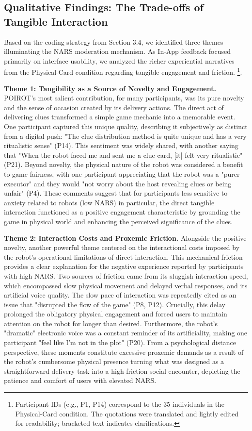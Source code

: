 \documentclass[sigconf,screen]{acmart-tagged}
\begin{document}
\vspace{-2pt}
\subsection{Qualitative Findings: The Trade-offs of Tangible Interaction}
Based on the coding strategy from Section 3.4, we identified three themes illuminating the NARS moderation mechanism. As In-App feedback focused primarily on interface usability, we analyzed the richer experiential narratives from the Physical-Card condition regarding tangible engagement and friction. \footnote{Participant IDs (e.g., P1, P14) correspond to the 35 individuals in the Physical-Card condition. The quotations were translated and lightly edited for readability; bracketed text indicates clarifications.}.

\noindent \textbf{Theme 1: Tangibility as a Source of Novelty and Engagement.}
POIROT's most salient contribution, for many participants, was its pure novelty and the sense of occasion created by its delivery actions. The direct act of delivering clues transformed a simple game mechanic into a memorable event. One participant captured this unique quality, describing it subjectively as distinct from a digital push: "The clue distribution method is quite unique and has a very ritualistic sense" (P14). This sentiment was widely shared, with another saying that "When the robot faced me and sent me a clue card, [it] felt very ritualistic" (P21). Beyond novelty, the physical nature of the robot was considered a benefit to game fairness, with one participant appreciating that the robot was a "purer executor" and they would "not worry about the host revealing clues or being unfair" (P4). These comments suggest that for participants less sensitive to anxiety related to robots (low NARS) in particular, the direct tangible interaction functioned as a positive engagement characteristic by grounding the game in physical world and enhancing the perceived significance of the clues.

\noindent \textbf{Theme 2: Interaction Costs and Proxemic Friction.}
Alongside the positive novelty, another powerful theme centered on the interactional costs imposed by the robot's operational limitations of direct interaction. This mechanical friction provides a clear explanation for the negative experience reported by participants with high NARS. Two sources of friction came from its sluggish interaction speed, which encompassed slow physical movement and delayed verbal responses, and its artificial voice quality. The slow pace of interaction was repeatedly cited as an issue that "disrupted the flow of the game" (P8, P12). Crucially, this delay prolonged the obligatory physical engagement and forced users to maintain attention on the robot for longer than desired. Furthermore, the robot's "dramatic" electronic voice was a constant reminder of its artificiality, making one participant "feel like I'm not in the plot" (P20). From a psychological distance perspective, these moments constitute excessive proxemic demands as a result of the robot's cumbersome physical presence turning what was designed as a straightforward delivery task into a high-friction social encounter, depleting the patience and comfort of users with elevated NARS.
\end{document}
